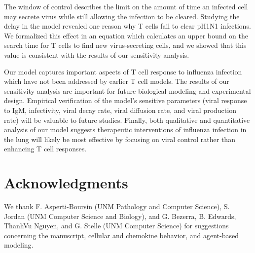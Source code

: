 \documentclass[10pt]{article}
\begin{document}
The window of control describes the limit on the amount of time an infected cell may secrete virus while still allowing the infection to be cleared.  Studying the delay in the model revealed one reason why T cells fail to clear pH1N1 infections.  We formalized this effect in an equation which calculates an upper bound on the search time for T cells to find new virus-secreting cells, and we showed that this value is consistent with the results of our sensitivity analysis.

Our model captures important aspects of T cell response to influenza infection which have not been addressed by earlier T cell models.  The results of our sensitivity analysis are important for future biological modeling and experimental design.  Empirical verification of the model's sensitive parameters (viral response to IgM, infectivity, viral decay rate, viral diffusion rate, and viral production rate) will be valuable to future studies.  Finally, both qualitative and quantitative analysis of our model suggests therapeutic interventions of influenza infection in the lung will likely be most effective by focusing on viral control rather than enhancing T cell responses.









\section*{Acknowledgments}

We thank F. Asperti-Boursin (UNM Pathology and Computer Science), S. Jordan (UNM Computer Science and Biology), and G. Bezerra, B. Edwards, ThanhVu Nguyen, and G. Stelle (UNM Computer Science) for suggestions concerning the manuscript, cellular and chemokine behavior, and agent-based modeling.
\end{document}
